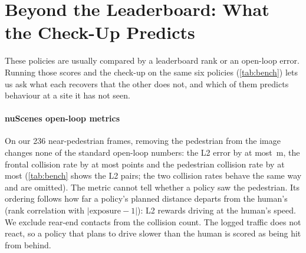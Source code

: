 \section{Beyond the Leaderboard: What the Check-Up Predicts}
\label{sec:bench}



These policies are usually compared by a leaderboard rank or an open-loop error. Running those scores
and the check-up on the same six policies (\cref{tab:bench}) lets us ask what each recovers that the
other does not, and which of them predicts behaviour at a site it has not seen.

\paragraph{nuScenes open-loop metrics}
On our 236 near-pedestrian frames, removing the pedestrian from the image changes none of the standard
open-loop numbers: the L2 error by at most \NumMaxdLtwo\,m, the frontal collision rate by at most
\NumMaxdCol{} points and the pedestrian collision rate by at most \NumMaxdPed{} (\cref{tab:bench}
shows the L2 pairs; the two collision rates behave the same way and are omitted). The metric cannot tell whether a policy saw the pedestrian. Its ordering follows how
far a policy's planned distance departs from the human's (rank correlation \NumRhoLtwoExp{} with
$|\text{exposure}-1|$): L2 rewards driving at the human's speed. We exclude rear-end contacts from the
collision count. The logged traffic does not react, so a policy that plans to drive slower than the
human is scored as being hit from behind.

